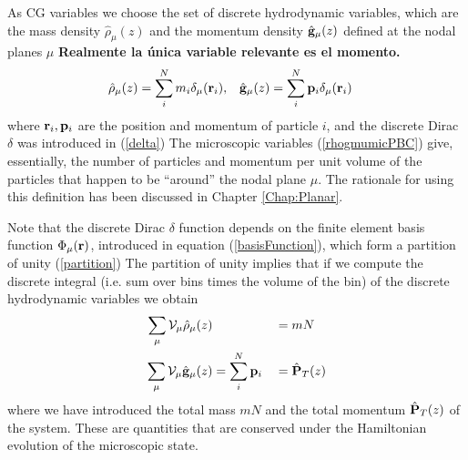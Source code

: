 \documentclass[b5paper,openright,10pt]{book}
\newcommand{\Note}[1]{{\bf \color{red}#1}}    %
\begin{document}
As CG variables we choose  the set of discrete hydrodynamic
variables,  which are  the  mass density  $\hat{\rho}_\mu(z)$ and  the
momentum  density $\hat{\bf  g}_\mu(z)$  defined at  the nodal  planes
$\mu$   \Note{Realmente la única variable relevante es el momento.}
\begin{align}
  \hat{\rho}_\mu(z)&= \sum_i^Nm_i\delta_\mu({\bf r}_i),&
\hat{\bf g}_\mu(z)&= \sum_i^N{\bf p}_i\delta_\mu({\bf r}_i)
\label{rhogmumicPBC}
\end{align}
where ${\bf r}_i,{\bf p}_i$ are the position and momentum of particle $i$, and the discrete Dirac $\delta$ was introduced in (\ref{delta})
The  microscopic  variables  (\ref{rhogmumicPBC})  give,
essentially, the number  of particles and momentum per  unit volume of
the particles that happen to be ``around'' the nodal plane $\mu$.  The rationale for using this definition has been discussed in Chapter \ref{Chap:Planar}.


Note that the discrete Dirac $\delta$ function depends on the finite  element basis  function $\Phi_\mu({\bf  r})$, introduced in equation (\ref{basisFunction}), which form a
partition of unity (\ref{partition})
The  partition  of unity  implies  that  if  we compute  the  discrete
integral  (i.e. sum  over bins  times the  volume of  the bin)  of the
discrete hydrodynamic variables we obtain
\begin{align}
  \sum_\mu{\cal V}_\mu\hat{\rho}_\mu(z)&  &&= mN
\nonumber\\
  \sum_\mu{\cal V}_\mu\hat{\bf g}_\mu(z)&=\sum_i^N{\bf p}_i&&= \hat{\bf P}_T(z)
\label{DiscCons}
\end{align}
where we  have introduced the total  mass $mN$ and the  total momentum
$\hat{\bf  P}_T(z)$ of  the  system.  These  are  quantities that  are
conserved under  the Hamiltonian  evolution of the  microscopic state.
\end{document}
